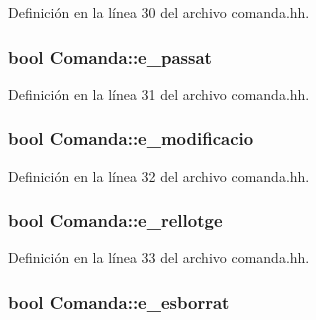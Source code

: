 Definición en la línea 30 del archivo comanda.\-hh.

\hypertarget{class_comanda_a38e7cdf2003076cbe88461f03dc2106c}{
\subsubsection[{e\-\_\-passat}]{\setlength{\rightskip}{0pt plus 5cm}bool Comanda\-::e\-\_\-passat\hspace{0.3cm}{\ttfamily [private]}}}\label{class_comanda_a38e7cdf2003076cbe88461f03dc2106c}


Definición en la línea 31 del archivo comanda.\-hh.

\hypertarget{class_comanda_a96d917429f6bfa73608d745ad1e1dfc7}{
\subsubsection[{e\-\_\-modificacio}]{\setlength{\rightskip}{0pt plus 5cm}bool Comanda\-::e\-\_\-modificacio\hspace{0.3cm}{\ttfamily [private]}}}\label{class_comanda_a96d917429f6bfa73608d745ad1e1dfc7}


Definición en la línea 32 del archivo comanda.\-hh.

\hypertarget{class_comanda_ad73910246f9c47c887a3c01b53350282}{
\subsubsection[{e\-\_\-rellotge}]{\setlength{\rightskip}{0pt plus 5cm}bool Comanda\-::e\-\_\-rellotge\hspace{0.3cm}{\ttfamily [private]}}}\label{class_comanda_ad73910246f9c47c887a3c01b53350282}


Definición en la línea 33 del archivo comanda.\-hh.

\hypertarget{class_comanda_a70a9790e90a45015dbcd4c6700ec0812}{
\subsubsection[{e\-\_\-esborrat}]{\setlength{\rightskip}{0pt plus 5cm}bool Comanda\-::e\-\_\-esborrat\hspace{0.3cm}{\ttfamily [private]}}}\label{class_comanda_a70a9790e90a45015dbcd4c6700ec0812}


